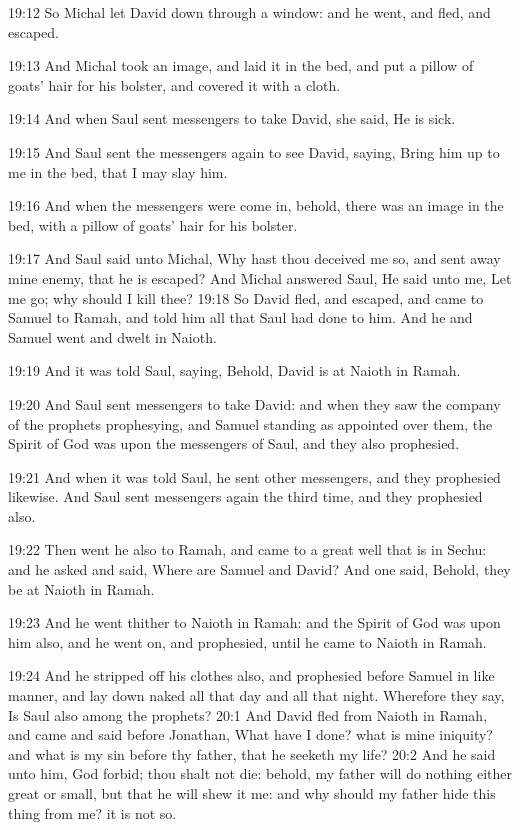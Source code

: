 19:12 So Michal let David down through a window: and he went, and
fled, and escaped.

19:13 And Michal took an image, and laid it in the bed, and put a
pillow of goats' hair for his bolster, and covered it with a cloth.

19:14 And when Saul sent messengers to take David, she said, He is
sick.

19:15 And Saul sent the messengers again to see David, saying, Bring
him up to me in the bed, that I may slay him.

19:16 And when the messengers were come in, behold, there was an image
in the bed, with a pillow of goats' hair for his bolster.

19:17 And Saul said unto Michal, Why hast thou deceived me so, and
sent away mine enemy, that he is escaped? And Michal answered Saul, He
said unto me, Let me go; why should I kill thee?  19:18 So David fled,
and escaped, and came to Samuel to Ramah, and told him all that Saul
had done to him. And he and Samuel went and dwelt in Naioth.

19:19 And it was told Saul, saying, Behold, David is at Naioth in
Ramah.

19:20 And Saul sent messengers to take David: and when they saw the
company of the prophets prophesying, and Samuel standing as appointed
over them, the Spirit of God was upon the messengers of Saul, and they
also prophesied.

19:21 And when it was told Saul, he sent other messengers, and they
prophesied likewise. And Saul sent messengers again the third time,
and they prophesied also.

19:22 Then went he also to Ramah, and came to a great well that is in
Sechu: and he asked and said, Where are Samuel and David? And one
said, Behold, they be at Naioth in Ramah.

19:23 And he went thither to Naioth in Ramah: and the Spirit of God
was upon him also, and he went on, and prophesied, until he came to
Naioth in Ramah.

19:24 And he stripped off his clothes also, and prophesied before
Samuel in like manner, and lay down naked all that day and all that
night. Wherefore they say, Is Saul also among the prophets?  20:1 And
David fled from Naioth in Ramah, and came and said before Jonathan,
What have I done? what is mine iniquity? and what is my sin before thy
father, that he seeketh my life?  20:2 And he said unto him, God
forbid; thou shalt not die: behold, my father will do nothing either
great or small, but that he will shew it me: and why should my father
hide this thing from me? it is not so.

